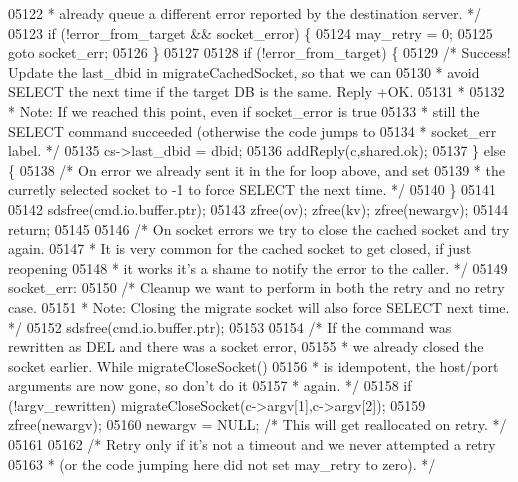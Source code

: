 \begin{DoxyCode}
{{{{{{{{{{{{{{{{{{{{{{{{{{{{{{{{{{{{{{{{{{{{{{{{{{{{{{{{{{{{{{{{{{{{{{{{{{{{{{{{{{{{{{{{{{{{{{{{{{{{{{{{{{{{05122 \textcolor{comment}{     * already queue a different error reported by the destination server. */}
05123     \textcolor{keywordflow}{if} (!error\_from\_target && socket\_error) \{
05124         may\_retry = 0;
05125         \textcolor{keywordflow}{goto} socket\_err;
05126     \}
05127 
05128     \textcolor{keywordflow}{if} (!error\_from\_target) \{
05129         \textcolor{comment}{/* Success! Update the last\_dbid in migrateCachedSocket, so that we can}
05130 \textcolor{comment}{         * avoid SELECT the next time if the target DB is the same. Reply +OK.}
05131 \textcolor{comment}{         *}
05132 \textcolor{comment}{         * Note: If we reached this point, even if socket\_error is true}
05133 \textcolor{comment}{         * still the SELECT command succeeded (otherwise the code jumps to}
05134 \textcolor{comment}{         * socket\_err label. */}
05135         cs->last\_dbid = dbid;
05136         addReply(c,shared.ok);
05137     \} \textcolor{keywordflow}{else} \{
05138         \textcolor{comment}{/* On error we already sent it in the for loop above, and set}
05139 \textcolor{comment}{         * the curretly selected socket to -1 to force SELECT the next time. */}
05140     \}
05141 
05142     sdsfree(cmd.io.buffer.ptr);
05143     zfree(ov); zfree(kv); zfree(newargv);
05144     \textcolor{keywordflow}{return};
05145 
05146 \textcolor{comment}{/* On socket errors we try to close the cached socket and try again.}
05147 \textcolor{comment}{ * It is very common for the cached socket to get closed, if just reopening}
05148 \textcolor{comment}{ * it works it's a shame to notify the error to the caller. */}
05149 socket\_err:
05150     \textcolor{comment}{/* Cleanup we want to perform in both the retry and no retry case.}
05151 \textcolor{comment}{     * Note: Closing the migrate socket will also force SELECT next time. */}
05152     sdsfree(cmd.io.buffer.ptr);
05153 
05154     \textcolor{comment}{/* If the command was rewritten as DEL and there was a socket error,}
05155 \textcolor{comment}{     * we already closed the socket earlier. While migrateCloseSocket()}
05156 \textcolor{comment}{     * is idempotent, the host/port arguments are now gone, so don't do it}
05157 \textcolor{comment}{     * again. */}
05158     \textcolor{keywordflow}{if} (!argv\_rewritten) migrateCloseSocket(c->argv[1],c->argv[2]);
05159     zfree(newargv);
05160     newargv = NULL; \textcolor{comment}{/* This will get reallocated on retry. */}
05161 
05162     \textcolor{comment}{/* Retry only if it's not a timeout and we never attempted a retry}
05163 \textcolor{comment}{     * (or the code jumping here did not set may\_retry to zero). */}
}}}}}}}}}}}}}}}}}}}}}}}}}}}}}}}}}}}}}}}}}}}}}}}}}}}}}}}}}}}}}}}}}}}}}}}}}}}}}}}}}}}}}}}}}}}}}}}}}}}}}}}}}}}}
\end{DoxyCode}
